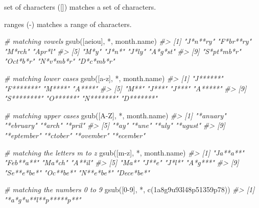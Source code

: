 \documentclass[
]{book}
\newenvironment{Shaded}{\begin{snugshade}}{\end{snugshade}}
\newcommand{\CommentTok}[1]{\textcolor[rgb]{0.56,0.35,0.01}{\textit{#1}}}
\newcommand{\FunctionTok}[1]{\textcolor[rgb]{0.00,0.00,0.00}{#1}}
\newcommand{\NormalTok}[1]{#1}
\newcommand{\StringTok}[1]{\textcolor[rgb]{0.31,0.60,0.02}{#1}}
\begin{document}
set of characters ({[}{]}) matches a set of characters.

ranges (-) matches a range of characters.

\begin{Shaded}
\begin{Highlighting}[]
\CommentTok{\# matching vowels}
\FunctionTok{gsub}\NormalTok{(}\StringTok{\textquotesingle{}[aeiou]\textquotesingle{}}\NormalTok{, }\StringTok{\textquotesingle{}*\textquotesingle{}}\NormalTok{, month.name)}
\CommentTok{\#\textgreater{}  [1] "J*n**ry"   "F*br**ry"  "M*rch"     "Apr*l"    }
\CommentTok{\#\textgreater{}  [5] "M*y"       "J*n*"      "J*ly"      "A*g*st"   }
\CommentTok{\#\textgreater{}  [9] "S*pt*mb*r" "Oct*b*r"   "N*v*mb*r"  "D*c*mb*r"}

\CommentTok{\# matching lower cases}
\FunctionTok{gsub}\NormalTok{(}\StringTok{\textquotesingle{}[a{-}z]\textquotesingle{}}\NormalTok{, }\StringTok{\textquotesingle{}*\textquotesingle{}}\NormalTok{, month.name)}
\CommentTok{\#\textgreater{}  [1] "J******"   "F*******"  "M****"     "A****"    }
\CommentTok{\#\textgreater{}  [5] "M**"       "J***"      "J***"      "A*****"   }
\CommentTok{\#\textgreater{}  [9] "S********" "O******"   "N*******"  "D*******"}

\CommentTok{\# matching upper cases}
\FunctionTok{gsub}\NormalTok{(}\StringTok{\textquotesingle{}[A{-}Z]\textquotesingle{}}\NormalTok{, }\StringTok{\textquotesingle{}*\textquotesingle{}}\NormalTok{, month.name)}
\CommentTok{\#\textgreater{}  [1] "*anuary"   "*ebruary"  "*arch"     "*pril"    }
\CommentTok{\#\textgreater{}  [5] "*ay"       "*une"      "*uly"      "*ugust"   }
\CommentTok{\#\textgreater{}  [9] "*eptember" "*ctober"   "*ovember"  "*ecember"}

\CommentTok{\# matching the letters m to z}
\FunctionTok{gsub}\NormalTok{(}\StringTok{\textquotesingle{}[m{-}z]\textquotesingle{}}\NormalTok{, }\StringTok{\textquotesingle{}*\textquotesingle{}}\NormalTok{, month.name)}
\CommentTok{\#\textgreater{}  [1] "Ja**a**"   "Feb**a**"  "Ma*ch"     "A**il"    }
\CommentTok{\#\textgreater{}  [5] "Ma*"       "J**e"      "J*l*"      "A*g***"   }
\CommentTok{\#\textgreater{}  [9] "Se**e*be*" "Oc**be*"   "N**e*be*"  "Dece*be*"}

\CommentTok{\# matching the numbers 0 to 9}
\FunctionTok{gsub}\NormalTok{(}\StringTok{\textquotesingle{}[0{-}9]\textquotesingle{}}\NormalTok{, }\StringTok{\textquotesingle{}*\textquotesingle{}}\NormalTok{, }\FunctionTok{c}\NormalTok{(}\StringTok{\textquotesingle{}1a8g9u93l48p51359p78\textquotesingle{}}\NormalTok{))}
\CommentTok{\#\textgreater{} [1] "*a*g*u**l**p*****p**"}


\end{Highlighting}
\end{Shaded}
\end{document}
